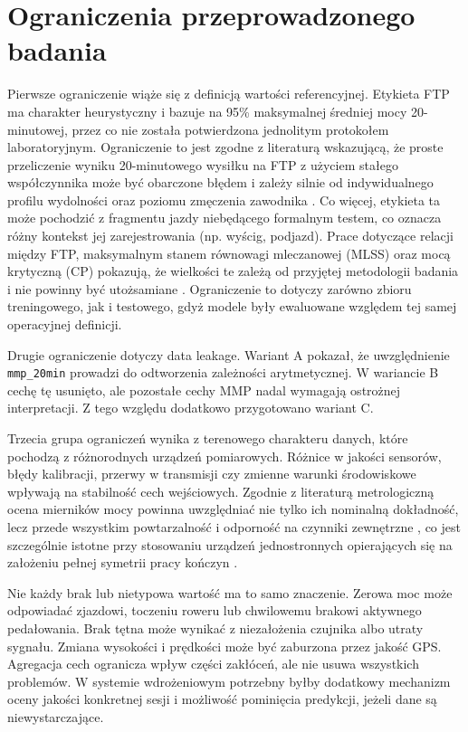 \section{Ograniczenia przeprowadzonego badania}

Pierwsze ograniczenie wiąże się z definicją wartości referencyjnej. Etykieta FTP ma charakter heurystyczny i bazuje na 95\% maksymalnej średniej mocy 20-minutowej, przez co nie została potwierdzona jednolitym protokołem laboratoryjnym. Ograniczenie to jest zgodne z literaturą wskazującą, że proste przeliczenie wyniku 20-minutowego wysiłku na FTP z użyciem stałego współczynnika może być obarczone błędem i zależy silnie od indywidualnego profilu wydolności oraz poziomu zmęczenia zawodnika \parencite{inglis2020ftp_mlss,jeffries2021ftp_lt}. Co więcej, etykieta ta może pochodzić z fragmentu jazdy niebędącego formalnym testem, co oznacza różny kontekst jej zarejestrowania (np. wyścig, podjazd). Prace dotyczące relacji między FTP, maksymalnym stanem równowagi mleczanowej (MLSS) oraz mocą krytyczną (CP) pokazują, że wielkości te zależą od przyjętej metodologii badania i nie powinny być utożsamiane \parencite{caen2024cp_mlss}. Ograniczenie to dotyczy zarówno zbioru treningowego, jak i testowego, gdyż modele były ewaluowane względem tej samej operacyjnej definicji.

Drugie ograniczenie dotyczy data leakage. Wariant A pokazał, że uwzględnienie \texttt{mmp\_20min} prowadzi do odtworzenia zależności arytmetycznej. W wariancie B cechę tę usunięto, ale pozostałe cechy MMP nadal wymagają ostrożnej interpretacji. Z tego względu dodatkowo przygotowano wariant C.

Trzecia grupa ograniczeń wynika z terenowego charakteru danych, które pochodzą z różnorodnych urządzeń pomiarowych. Różnice w jakości sensorów, błędy kalibracji, przerwy w transmisji czy zmienne warunki środowiskowe wpływają na stabilność cech wejściowych. Zgodnie z literaturą metrologiczną ocena mierników mocy powinna uwzględniać nie tylko ich nominalną dokładność, lecz przede wszystkim powtarzalność i odporność na czynniki zewnętrzne \parencite{bouillod2022powerMeters}, co jest szczególnie istotne przy stosowaniu urządzeń jednostronnych opierających się na założeniu pełnej symetrii pracy kończyn \parencite{valenzuela2022unilateral}.

Nie każdy brak lub nietypowa wartość ma to samo znaczenie. Zerowa moc może odpowiadać zjazdowi, toczeniu roweru lub chwilowemu brakowi aktywnego pedałowania. Brak tętna może wynikać z niezałożenia czujnika albo utraty sygnału. Zmiana wysokości i prędkości może być zaburzona przez jakość GPS. Agregacja cech ogranicza wpływ części zakłóceń, ale nie usuwa wszystkich problemów. W systemie wdrożeniowym potrzebny byłby dodatkowy mechanizm oceny jakości konkretnej sesji i możliwość pominięcia predykcji, jeżeli dane są niewystarczające.

